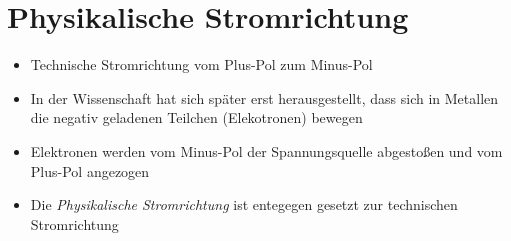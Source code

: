 
\section{Physikalische Stromrichtung}
\label{section:physikalische_stromrichtung}
\begin{frame}%
\begin{itemize}
  \item Technische Stromrichtung vom Plus-Pol zum Minus-Pol
  \item In der Wissenschaft hat sich später erst herausgestellt, dass sich in Metallen die negativ geladenen Teilchen (Elekotronen) bewegen
  \item Elektronen werden vom Minus-Pol der Spannungsquelle abgestoßen und vom Plus-Pol angezogen
  \item Die \emph{Physikalische Stromrichtung} ist entegegen gesetzt zur technischen Stromrichtung
  \end{itemize}

\end{frame}

\begin{frame}
\end{frame}%
